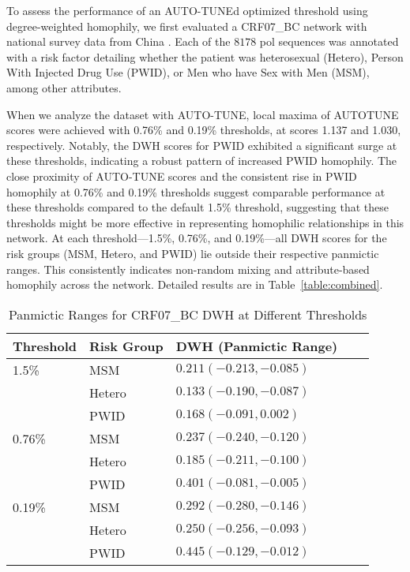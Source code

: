\documentclass[utf8]{FrontiersinHarvard} %
\begin{document}
To assess the performance of an AUTO-TUNEd optimized threshold using
degree-weighted homophily, we first evaluated a CRF07\_BC network with national survey data
from China \cite{Ge:2021aa} .  Each of the $8178$ 
pol sequences was annotated with a risk factor detailing whether the patient was
heterosexual (Hetero), Person With Injected Drug Use (PWID), or Men who have
Sex with Men (MSM), among other attributes.

When we analyze the dataset with AUTO-TUNE,  local maxima of AUTOTUNE scores were achieved
with 0.76\% and 0.19\% thresholds, at scores 1.137 and 1.030, respectively.
Notably, the DWH scores for PWID exhibited a significant surge at these
thresholds, indicating a robust pattern of increased PWID homophily. The close
proximity of AUTO-TUNE scores and the consistent rise in PWID homophily at
0.76\% and 0.19\% thresholds suggest comparable performance at these thresholds
compared to the default 1.5\% threshold, suggesting that these thresholds might
be more effective in representing homophilic relationships in this network. At
each threshold—1.5\%, 0.76\%, and 0.19\%—all DWH scores for the risk groups
(MSM, Hetero, and PWID) lie outside their respective panmictic ranges. This
consistently indicates non-random mixing and attribute-based homophily across
the network. Detailed results are in Table~\ref{table:combined}.

\begin{table}[h!]
	\centering
	\begin{tabular}{lllll}
		\hline
		Threshold & Risk Group & DWH   (Panmictic Range) \\
		\hline
		1.5\%     & MSM        & $0.211  (-0.213, -0.085)$        \\
		     & Hetero     & $0.133 (-0.190, -0.087)$       \\
		     & PWID       & $0.168 (-0.091, 0.002)$       \\
		\hline
		0.76\%    & MSM        & $0.237 (-0.240, -0.120)$       \\
		  & Hetero     & $0.185 (-0.211, -0.100)$       \\
		   & PWID       & $0.401 (-0.081, -0.005)$       \\
		\hline
		0.19\%    & MSM        & $0.292 (-0.280, -0.146)$       \\
		    & Hetero     & $0.250 (-0.256, -0.093)$       \\
		    & PWID       & $0.445 (-0.129, -0.012)$       \\
		\hline
	\end{tabular}
	\caption{Panmictic Ranges for CRF07\_BC DWH at Different Thresholds}
	\label{table:panmictic}
\end{table}
\end{document}
